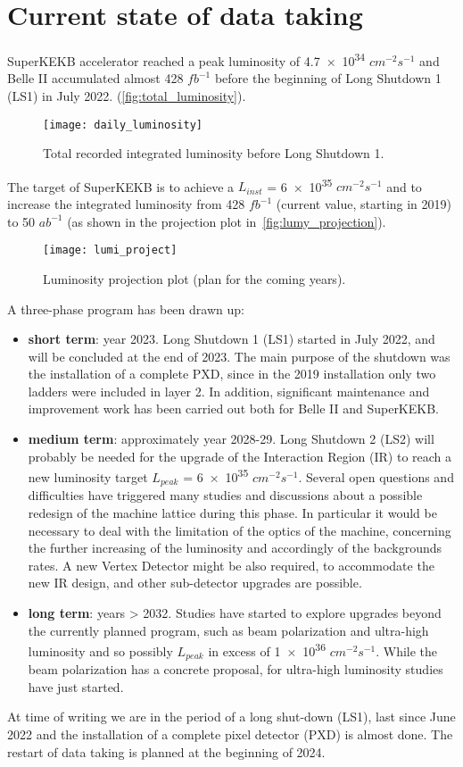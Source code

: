 \section{Current state of data taking} \label{sec:perspectives}

SuperKEKB accelerator reached a peak luminosity of \num{4.7e34} $cm^{-2}s^{-1}$ and Belle II accumulated almost 428 $fb^{-1}$ before the beginning of Long Shutdown 1 (LS1) in July 2022. (\autoref{fig:total_luminosity}).

\begin{figure}[h!]
\centering
\texttt{[image: daily\_luminosity]}
\caption{Total recorded integrated luminosity before Long Shutdown 1.}
\label{fig:total_luminosity}
\end{figure}

The target of SuperKEKB is to achieve a \textit{$L_{inst}$} = \num{6e35} $cm^{-2}s^{-1}$ and to increase the integrated luminosity from 428 $fb^{-1}$ (current value, starting in 2019) to 50 $ab^{-1}$ (as shown in the projection plot in~\autoref{fig:lumy_projection}).\\

\begin{figure}
\centering
\texttt{[image: lumi\_project]}
\caption{Luminosity projection plot (plan for the coming years).}
\label{fig:lumy_projection}
\end{figure}


A three-phase program has been drawn up:

\begin{itemize}
\item \textbf{short term}: year 2023. Long Shutdown 1 (LS1) started in July 2022, and will be concluded at the end of 2023. The main purpose of the shutdown was the installation of a complete PXD, since in the 2019 installation only two ladders were included in layer 2. In addition, significant maintenance and improvement work has been carried out both for Belle II and SuperKEKB.
\item \textbf{medium term}: approximately year 2028-29. Long Shutdown 2 (LS2) will probably be needed for the upgrade of the Interaction Region (IR) to reach a new luminosity target $\textit{L}_{peak}$ = \num{6e35} $cm^{-2}s^{-1}$. 
Several open questions and difficulties have triggered many studies and discussions about a possible redesign of the machine lattice during this phase. In particular it would be necessary to deal with the limitation of the optics of the machine, concerning the further increasing of the luminosity and accordingly of the backgrounds rates. A new Vertex Detector might be also required, to accommodate the new IR design, and other sub-detector upgrades are possible. 
\item \textbf{long term}: years > 2032. Studies have started to explore upgrades beyond the currently planned program, such as beam polarization and ultra-high luminosity and so possibly $\textit{L}_{peak}$ in excess of \num{1e36} $cm^{-2}s^{-1}$. While the beam polarization has a concrete proposal, for ultra-high luminosity studies have just started.
\end{itemize}

At time of writing we are in the period of a long shut-down (LS1), last since June 2022 and the installation of a complete pixel detector (PXD) is almost done. The restart of data taking is planned at the beginning of 2024.

